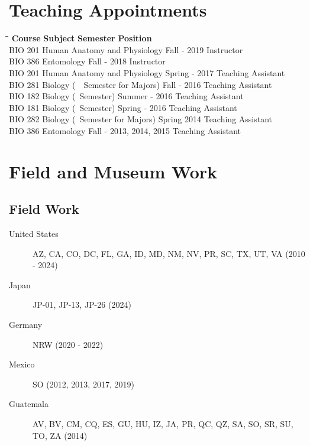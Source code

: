 \documentclass[12pt,a4paper]{article}
\begin{document}
\section*{Teaching Appointments}
	\begin{tabbing}
		\hspace{2cm}\=\hspace{6.5cm}\=\hspace{4cm}\=\kill
		\textbf{Course} \> \textbf{Subject} \> \textbf{Semester} \> \textbf{Position}\\
		BIO 201 \> Human Anatomy and Physiology \> Fall - 2019 \> Instructor \\
		BIO 386 \> Entomology \> Fall - 2018 \> Instructor \\ 
		BIO 201 \> Human Anatomy and Physiology \> Spring - 2017 \> Teaching Assistant \\
		BIO 281 \> Biology (~~Semester for Majors) \> Fall - 2016 \> Teaching Assistant \\
		BIO 182 \> Biology (~Semester) \> Summer - 2016 \> Teaching Assistant \\
		BIO 181 \> Biology (~Semester) \> Spring - 2016 \> Teaching Assistant \\
		BIO 282 \> Biology (~Semester for Majors) \> Spring 2014 \> Teaching Assistant \\
		BIO 386 \> Entomology \> Fall - 2013, 2014, 2015 \> Teaching Assistant
	\end{tabbing} 

\section*{Field and Museum Work}
	\subsection*{Field Work}
		\begin{description}
			\item [United States] \tabto*{3cm} AZ, CA, CO, DC, FL, GA, ID, MD, NM, NV, PR, SC, TX, UT, VA (2010 - 2024)
			\item [Japan] \tabto*{3cm} JP-01, JP-13, JP-26 (2024)
			\item [Germany] \tabto*{3cm} NRW (2020 - 2022)
			\item [Mexico] \tabto*{3cm} SO (2012, 2013, 2017, 2019)
			\item [Guatemala] \tabto*{3cm} AV, BV, CM, CQ, ES, GU, HU, IZ, JA, PR, QC, QZ, SA, SO, SR, SU, TO, ZA (2014)
		\end{description}
\end{document}
